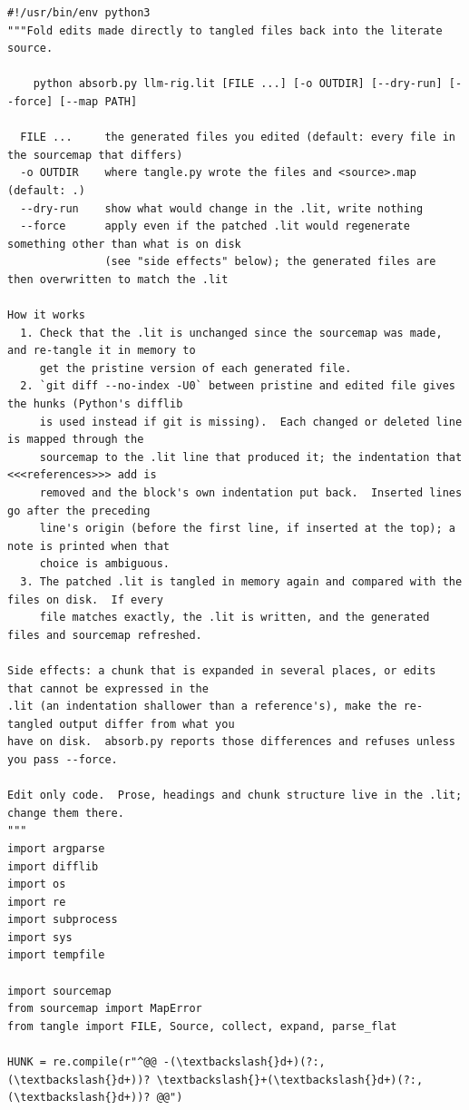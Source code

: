\documentclass[10pt,a4paper]{article}
\newcounter{chunk}
\begin{document}
\begin{Verbatim}
#!/usr/bin/env python3
"""Fold edits made directly to tangled files back into the literate source.

    python absorb.py llm-rig.lit [FILE ...] [-o OUTDIR] [--dry-run] [--force] [--map PATH]

  FILE ...     the generated files you edited (default: every file in the sourcemap that differs)
  -o OUTDIR    where tangle.py wrote the files and <source>.map (default: .)
  --dry-run    show what would change in the .lit, write nothing
  --force      apply even if the patched .lit would regenerate something other than what is on disk
               (see "side effects" below); the generated files are then overwritten to match the .lit

How it works
  1. Check that the .lit is unchanged since the sourcemap was made, and re-tangle it in memory to
     get the pristine version of each generated file.
  2. `git diff --no-index -U0` between pristine and edited file gives the hunks (Python's difflib
     is used instead if git is missing).  Each changed or deleted line is mapped through the
     sourcemap to the .lit line that produced it; the indentation that <<<references>>> add is
     removed and the block's own indentation put back.  Inserted lines go after the preceding
     line's origin (before the first line, if inserted at the top); a note is printed when that
     choice is ambiguous.
  3. The patched .lit is tangled in memory again and compared with the files on disk.  If every
     file matches exactly, the .lit is written, and the generated files and sourcemap refreshed.

Side effects: a chunk that is expanded in several places, or edits that cannot be expressed in the
.lit (an indentation shallower than a reference's), make the re-tangled output differ from what you
have on disk.  absorb.py reports those differences and refuses unless you pass --force.

Edit only code.  Prose, headings and chunk structure live in the .lit; change them there.
"""
import argparse
import difflib
import os
import re
import subprocess
import sys
import tempfile

import sourcemap
from sourcemap import MapError
from tangle import FILE, Source, collect, expand, parse_flat

HUNK = re.compile(r"^@@ -(\textbackslash{}d+)(?:,(\textbackslash{}d+))? \textbackslash{}+(\textbackslash{}d+)(?:,(\textbackslash{}d+))? @@")
\end{Verbatim}
\end{document}
